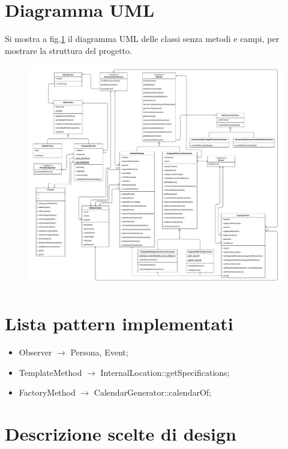 \documentclass[a4paper,11pt]{article}
\begin{document}
	\section{Diagramma UML}
	Si mostra a fig.\ref{classdiagram} il diagramma UML delle classi senza metodi e campi, per mostrare la struttura del progetto.
	
	\begin{figure}[htb!]
		\noindent\includegraphics[width=\textwidth]{diagramma/ClassDiagramm-NoTypes.pdf}
		\label{classdiagram}
	\end{figure}
	\section{Lista pattern implementati}
	\begin{itemize}
		\item Observer $\rightarrow$ Persona, Event;
		\item TemplateMethod $\rightarrow$ InternalLocation::getSpecifications;
		\item FactoryMethod $\rightarrow$ CalendarGenerator::calendarOf;
	\end{itemize}
	\section{Descrizione scelte di design}
\end{document}
